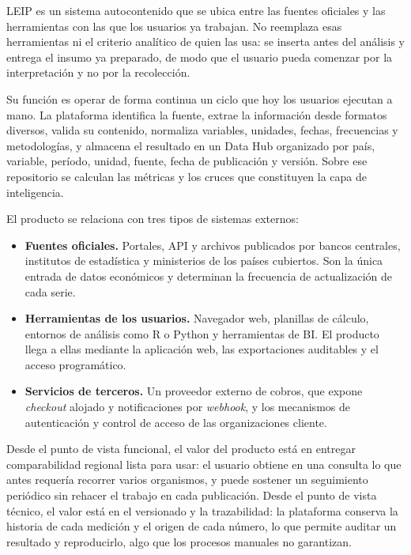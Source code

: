 \documentclass[11pt,a4paper]{article}
\newcommand{\proyectoNombre}{LEIP}
\begin{document}
\proyectoNombre{} es un sistema autocontenido que se ubica entre las fuentes
oficiales y las herramientas con las que los usuarios ya trabajan. No reemplaza
esas herramientas ni el criterio anal\'itico de quien las usa: se inserta antes
del an\'alisis y entrega el insumo ya preparado, de modo que el usuario pueda
comenzar por la interpretaci\'on y no por la recolecci\'on.

Su funci\'on es operar de forma continua un ciclo que hoy los usuarios ejecutan
a mano. La plataforma identifica la fuente, extrae la informaci\'on desde
formatos diversos, valida su contenido, normaliza variables, unidades, fechas,
frecuencias y metodolog\'ias, y almacena el resultado en un Data Hub organizado
por pa\'is, variable, per\'iodo, unidad, fuente, fecha de publicaci\'on y
versi\'on. Sobre ese repositorio se calculan las m\'etricas y los cruces que
constituyen la capa de inteligencia.

El producto se relaciona con tres tipos de sistemas externos:

\begin{itemize}
  \item \textbf{Fuentes oficiales.} Portales, API y archivos publicados por
        bancos centrales, institutos de estad\'istica y ministerios de los
        pa\'ises cubiertos. Son la \'unica entrada de datos econ\'omicos y
        determinan la frecuencia de actualizaci\'on de cada serie.
  \item \textbf{Herramientas de los usuarios.} Navegador web, planillas de
        c\'alculo, entornos de an\'alisis como R o Python y herramientas de BI.
        El producto llega a ellas mediante la aplicaci\'on web, las
        exportaciones auditables y el acceso program\'atico.
  \item \textbf{Servicios de terceros.} Un proveedor externo de cobros, que
        expone \emph{checkout} alojado y notificaciones por \emph{webhook}, y
        los mecanismos de autenticaci\'on y control de acceso de las
        organizaciones cliente.
\end{itemize}

Desde el punto de vista funcional, el valor del producto est\'a en entregar
comparabilidad regional lista para usar: el usuario obtiene en una consulta lo
que antes requer\'ia recorrer varios organismos, y puede sostener un seguimiento
peri\'odico sin rehacer el trabajo en cada publicaci\'on. Desde el punto de
vista t\'ecnico, el valor est\'a en el versionado y la trazabilidad: la
plataforma conserva la historia de cada medici\'on y el origen de cada n\'umero,
lo que permite auditar un resultado y reproducirlo, algo que los procesos
manuales no garantizan.
\end{document}
